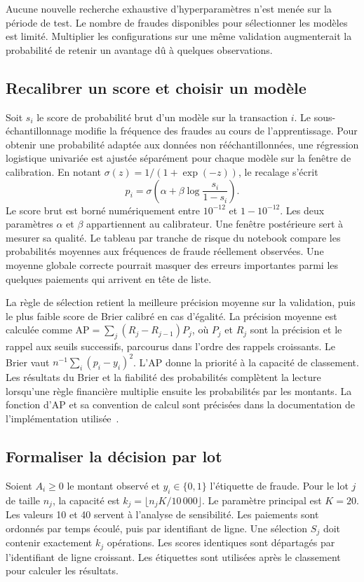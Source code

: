 \documentclass[11pt,a4paper]{article}
\begin{document}
Aucune nouvelle recherche exhaustive d'hyperparamètres n'est menée sur la période de test. Le nombre de fraudes disponibles pour sélectionner les modèles est limité. Multiplier les configurations sur une même validation augmenterait la probabilité de retenir un avantage dû à quelques observations.

\subsection{Recalibrer un score et choisir un modèle}
Soit $s_i$ le score de probabilité brut d'un modèle sur la transaction $i$. Le sous-échantillonnage modifie la fréquence des fraudes au cours de l'apprentissage. Pour obtenir une probabilité adaptée aux données non rééchantillonnées, une régression logistique univariée est ajustée séparément pour chaque modèle sur la fenêtre de calibration. En notant $\sigma(z)=1/(1+\exp(-z))$, le recalage s'écrit
\begin{equation}
 p_i=\sigma\!\left(\alpha+\beta\log\!\frac{s_i}{1-s_i}\right).
 \label{eq:calibration}
\end{equation}
Le score brut est borné numériquement entre $10^{-12}$ et $1-10^{-12}$. Les deux paramètres $\alpha$ et $\beta$ appartiennent au calibrateur. Une fenêtre postérieure sert à mesurer sa qualité. Le tableau par tranche de risque du notebook compare les probabilités moyennes aux fréquences de fraude réellement observées. Une moyenne globale correcte pourrait masquer des erreurs importantes parmi les quelques paiements qui arrivent en tête de liste.

La règle de sélection retient la meilleure précision moyenne sur la validation, puis le plus faible score de Brier calibré en cas d'égalité. La précision moyenne est calculée comme $\mathrm{AP}=\sum_j(R_j-R_{j-1})P_j$, où $P_j$ et $R_j$ sont la précision et le rappel aux seuils successifs, parcourus dans l'ordre des rappels croissants. Le Brier vaut $n^{-1}\sum_i(p_i-y_i)^2$. L'AP donne la priorité à la capacité de classement. Les résultats du Brier et la fiabilité des probabilités complètent la lecture lorsqu'une règle financière multiplie ensuite les probabilités par les montants. La fonction d'AP et sa convention de calcul sont précisées dans la documentation de l'implémentation utilisée~\cite{sklearnAP}.

\subsection{Formaliser la décision par lot}
Soient $A_i\geq 0$ le montant observé et $y_i\in\{0,1\}$ l'étiquette de fraude. Pour le lot $j$ de taille $n_j$, la capacité est $k_j=\lfloor n_j K/10\,000\rfloor$. Le paramètre principal est $K=20$. Les valeurs 10 et 40 servent à l'analyse de sensibilité. Les paiements sont ordonnés par temps écoulé, puis par identifiant de ligne. Une sélection $S_j$ doit contenir exactement $k_j$ opérations. Les scores identiques sont départagés par l'identifiant de ligne croissant. Les étiquettes sont utilisées après le classement pour calculer les résultats.
\end{document}
